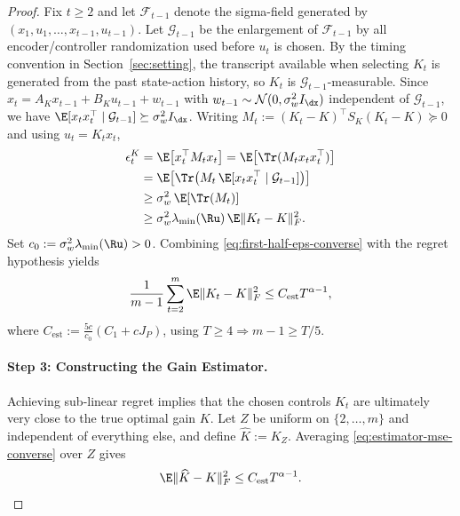 \documentclass[11pt,journal,onecolumn]{IEEEtran}
\begin{document}
\begin{proof}
\medskip
Fix $t\ge 2$ and let $\mathcal F_{t-1}$ denote the sigma-field generated by $(x_1,u_1,\ldots,x_{t-1},u_{t-1})$. Let $\mathcal G_{t-1}$ be the enlargement of $\mathcal F_{t-1}$ by all encoder/controller randomization used before $u_t$ is chosen. By the timing convention in Section~\ref{sec:setting}, the transcript available when selecting $K_t$ is generated from the past state-action history, so $K_t$ is $\mathcal G_{t-1}$-measurable. Since
$x_t = A_Kx_{t-1} + B_Ku_{t-1} + w_{t-1}$
with $w_{t-1}\sim\mathcal N(0,\sigma_w^2 I_{\dx})$ independent of $\mathcal G_{t-1}$, we have
$\E[x_t x_t^\top \mid \mathcal G_{t-1}] \succeq \sigma_w^2 I_{\dx}$.
Writing $M_t := (K_t-K)^\top S_K (K_t-K)\succeq 0$ and using $u_t=K_tx_t$,
\begin{align}\label{eq:eps-lower-bound}
    \epsilon_t^K
    &=
    \E\!\left[x_t^\top M_t x_t\right]
    =
    \E\!\left[\Tr(M_t x_t x_t^\top)\right] \nonumber\\
    &=
    \E\!\left[\Tr\!\left(M_t\,\E[x_t x_t^\top \mid \mathcal G_{t-1}]\right)\right] \nonumber\\
    &\ge
    \sigma_w^2\,\E\!\left[\Tr(M_t)\right] \nonumber\\
    &\ge
    \sigma_w^2\lambda_{\min}(\Ru)\,\E\|K_t-K\|_F^2.
\end{align}
Set $c_0 := \sigma_w^2\lambda_{\min}(\Ru)>0$.
Combining \eqref{eq:first-half-eps-converse} with the regret hypothesis yields
\begin{equation}
\label{eq:estimator-mse-converse}
    \frac{1}{m-1}\sum_{t=2}^m \E\|K_t-K\|_F^2
    \le
    C_{\mathrm{est}} T^{\alpha-1},
\end{equation}
where
$C_{\mathrm{est}} := \frac{5c}{c_0}\left(C_1 + c J_P\right)$,
using $T\ge 4 \Rightarrow m-1\ge T/5$.

\medskip
\paragraph{Step 3: Constructing the Gain Estimator.} Achieving sub-linear regret implies that the chosen controls $K_t$ are ultimately very close to the true optimal gain $K$. Let $Z$ be uniform on $\{2,\dots,m\}$ and independent of everything else, and define $\widehat K := K_Z$.
Averaging \eqref{eq:estimator-mse-converse} over $Z$ gives
\begin{equation}
\label{eq:Khat-error}
    \E\|\widehat K-K\|_F^2 \le C_{\mathrm{est}} T^{\alpha-1}.
\end{equation}

\medskip

\end{proof}
\end{document}
